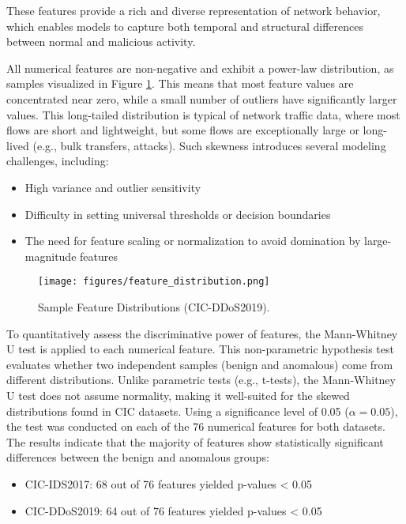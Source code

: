 These features provide a rich and diverse representation of network behavior, which enables models to capture both temporal and structural differences between normal and malicious activity.

All numerical features are non-negative and exhibit a power-law distribution, as samples visualized in Figure \ref{fig:feature_distribution}. This means that most feature values are concentrated near zero, while a small number of outliers have significantly larger values. This long-tailed distribution is typical of network traffic data, where most flows are short and lightweight, but some flows are exceptionally large or long-lived (e.g., bulk transfers, attacks). Such skewness introduces several modeling challenges, including:

\begin{itemize}
    \item High variance and outlier sensitivity
    \item Difficulty in setting universal thresholds or decision boundaries
    \item The need for feature scaling or normalization to avoid domination by large-magnitude features
\end{itemize}

\begin{figure}[h]
    \centering
    \texttt{[image: figures/feature\_distribution.png]}
    \caption{Sample Feature Distributions (CIC-DDoS2019).}
    \label{fig:feature_distribution}
\end{figure}

To quantitatively assess the discriminative power of features, the Mann-Whitney U test is applied to each numerical feature. This non-parametric hypothesis test evaluates whether two independent samples (benign and anomalous) come from different distributions. Unlike parametric tests (e.g., t-tests), the Mann-Whitney U test does not assume normality, making it well-suited for the skewed distributions found in CIC datasets. Using a significance level of 0.05 ($\alpha = 0.05$), the test was conducted on each of the 76 numerical features for both datasets. The results indicate that the majority of features show statistically significant differences between the benign and anomalous groups:

\begin{itemize}
    \item CIC-IDS2017: 68 out of 76 features yielded p-values < 0.05
    \item CIC-DDoS2019: 64 out of 76 features yielded p-values < 0.05
\end{itemize}

